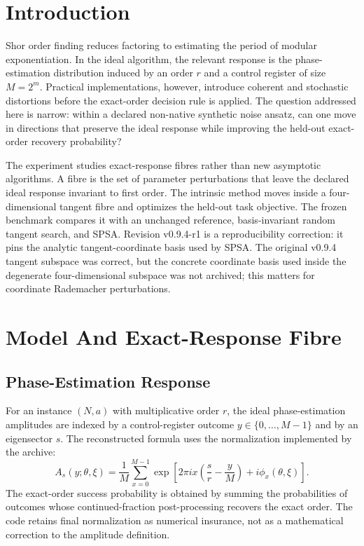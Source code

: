 \documentclass[11pt]{article}
\begin{document}
\section{Introduction}

Shor order finding reduces factoring to estimating the period of modular
exponentiation.  In the ideal algorithm, the relevant response is the
phase-estimation distribution induced by an order $r$ and a control register
of size $M=2^m$.  Practical implementations, however, introduce coherent and
stochastic distortions before the exact-order decision rule is applied.  The
question addressed here is narrow: within a declared non-native synthetic
noise ansatz, can one move in directions that preserve the ideal response while
improving the held-out exact-order recovery probability?

The experiment studies exact-response fibres rather than new asymptotic
algorithms.  A fibre is the set of parameter perturbations that leave the
declared ideal response invariant to first order.  The intrinsic method moves
inside a four-dimensional tangent fibre and optimizes the held-out task
objective.  The frozen benchmark compares it with an unchanged reference,
basis-invariant random tangent search, and SPSA.  Revision v0.9.4-r1 is a
reproducibility correction: it pins the analytic tangent-coordinate basis used
by SPSA.  The original v0.9.4 tangent subspace was correct, but the concrete
coordinate basis used inside the degenerate four-dimensional subspace was not
archived; this matters for coordinate Rademacher perturbations.

\section{Model And Exact-Response Fibre}

\subsection{Phase-Estimation Response}

For an instance $(N,a)$ with multiplicative order $r$, the ideal
phase-estimation amplitudes are indexed by a control-register outcome
$y\in\{0,\ldots,M-1\}$ and by an eigensector $s$.  The reconstructed formula
uses the normalization implemented by the archive:
\begin{equation}
A_s(y;\theta,\xi)
= \frac{1}{M}\sum_{x=0}^{M-1}
\exp\left[
2\pi i x\left(\frac{s}{r}-\frac{y}{M}\right)
+ i\phi_x(\theta,\xi)
\right].
\end{equation}
The exact-order success probability is obtained by summing the probabilities
of outcomes whose continued-fraction post-processing recovers the exact
order.  The code retains final normalization as numerical insurance, not as a
mathematical correction to the amplitude definition.
\end{document}

